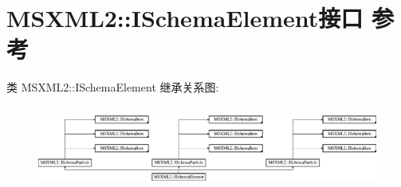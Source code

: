 \hypertarget{interface_m_s_x_m_l2_1_1_i_schema_element}{}\section{M\+S\+X\+M\+L2\+:\+:I\+Schema\+Element接口 参考}
\label{interface_m_s_x_m_l2_1_1_i_schema_element}
类 M\+S\+X\+M\+L2\+:\+:I\+Schema\+Element 继承关系图\+:\begin{figure}[H]
\begin{center}
\leavevmode
\includegraphics[height=2.729045cm]{interface_m_s_x_m_l2_1_1_i_schema_element}
\end{center}
\end{figure}
